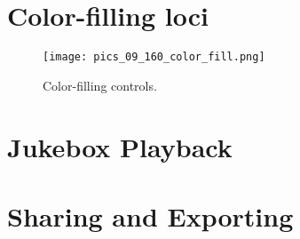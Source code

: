 \section{Color-filling loci}

\begin{figure}
    \centering
    \texttt{[image: pics\_09\_160\_color\_fill.png]}
    \caption{Color-filling controls.}
    \label{fig:09-color-filling}
\end{figure}

\section{Jukebox Playback}

\section{Sharing and Exporting}




